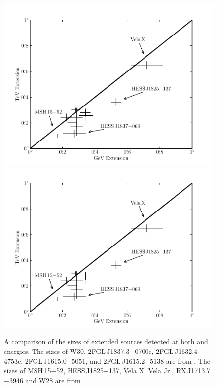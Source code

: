 \begin{figure}[htbp]
    \ifcolorfigure
      \includegraphics{summary_plots/gev_vs_tev_plot_color.pdf}
    \else
      \includegraphics{summary_plots/gev_vs_tev_plot_bw.pdf}
      \fi
    \caption{
    A comparison of the sizes of extended sources detected at
    both \gev and \tev energies.  The \tev sizes of W30,
    2FGL\,J1837.3$-$0700c, 2FGL\,J1632.4$-$4753c, 2FGL\,J1615.0$-$5051,
    and 2FGL\,J1615.2$-$5138 are from \cite{aharonian_2006_h.e.s.s.-survey}.
    The \tev sizes of MSH\,15$-$52, HESS\,J1825$-$137,
    Vela X, Vela Jr., RX\,J1713.7$-$3946 and W28 are from
}
\end{figure}
